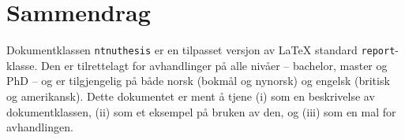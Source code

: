 \chapter*{Sammendrag}

Dokumentklassen \texttt{ntnuthesis} er en tilpasset versjon av \LaTeX{} standard \texttt{report}-klasse. Den er tilrettelagt for avhandlinger på alle nivåer – bachelor, master og PhD – og er tilgjengelig på både norsk (bokmål og nynorsk) og engelsk (britisk og amerikansk). Dette dokumentet er ment å tjene (i) som en beskrivelse av dokument\-klassen, (ii) som et eksempel på bruken av den, og (iii) som en mal for avhandlingen.

